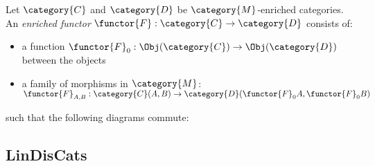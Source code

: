 \documentclass[DIN, pagenumber=false, fontsize=11pt, parskip=half, colorinlistoftodos, svgnames]{scrartcl}
\begin{document}
	\begin{definition}
		\label{def: enrichedFunctors}
		Let $\category{C} $ and $\category{D} $ be $\category{M} $-enriched categories. An \emph{enriched functor} $\functor{F} : \category{C} \rightarrow \category{D} $ consists of:
		\begin{itemize}
			\item 
			a function $\functor{F}_0 : \Obj(\category{C}) \rightarrow \Obj(\category{D}) $ between the objects
			\item 
			a family of morphisms in $\category{M} $: $\functor{F}_{A,B} : \category{C}(A, B) \rightarrow \category{D}(\functor{F}_0 A , \functor{F}_0 B) $
		\end{itemize}
		such that the following diagrams commute:
		\begin{center}
			
		\end{center}
	\end{definition}
	
	
	\subsection{LinDisCats}
	\label{sec: linDisCats}
	
\end{document}
